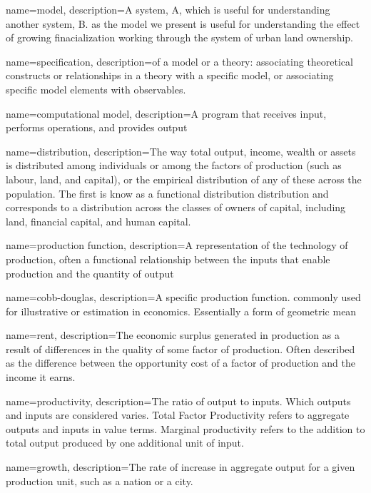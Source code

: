 {
name=model,
description={A system, A, which is useful for understanding another system, B. as the model we present is useful for understanding the effect of growing finacialization working through the system of urban land ownership. }
}

{
name=specification,
description={of a model or a theory: associating theoretical constructs or relationships in a theory with a specific model, or associating specific model elements with observables. }
}

{
name=computational model,
description={A program that receives input, performs operations, and provides output}
}

{
name=distribution,
description={The way total output, income, wealth or assets is distributed among individuals or among the factors of production (such as labour, land, and capital), or the empirical distribution of any of these across the population. The first is know as a functional distribution distribution and  corresponds to a distribution across the classes of owners  of capital, including land, financial capital, and human capital. }
}

{
name=production function,
description={A representation of the technology of production, often a functional relationship between the inputs that enable production and the quantity of output}
}

{
name=cobb-douglas,
description={A specific production function. commonly used for illustrative or estimation in economics. Essentially a form of geometric mean}
}

{
name=rent,
description={The economic  surplus generated in production as a result of differences in the quality of some factor of production. Often described as the difference between the opportunity cost of a factor of production and the income it earns. }
}

{
name=productivity,
description={The ratio of output to inputs. Which outputs and inputs are considered varies. Total Factor Productivity refers to aggregate outputs and inputs in value terms. Marginal productivity refers to the addition to total output produced by one additional unit of input.} 
}

{
name=growth,
description={The rate of increase in aggregate output for a given production unit, such as a nation  or a city.}
}

